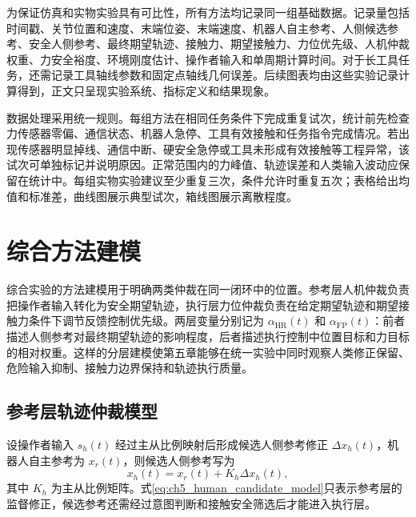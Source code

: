 为保证仿真和实物实验具有可比性，所有方法均记录同一组基础数据。记录量包括时间戳、关节位置和速度、末端位姿、末端速度、机器人自主参考、人侧候选参考、安全人侧参考、最终期望轨迹、接触力、期望接触力、力位优先级、人机仲裁权重、力安全裕度、环境刚度估计、操作者输入和单周期计算时间。对于长工具任务，还需记录工具轴线参数和固定点轴线几何误差。后续图表均由这些实验记录计算得到，正文只呈现实验系统、指标定义和结果现象。

数据处理采用统一规则。每组方法在相同任务条件下完成重复试次，统计前先检查力传感器零偏、通信状态、机器人急停、工具有效接触和任务指令完成情况。若出现传感器明显掉线、通信中断、硬安全急停或工具未形成有效接触等工程异常，该试次可单独标记并说明原因。正常范围内的力峰值、轨迹误差和人类输入波动应保留在统计中。每组实物实验建议至少重复三次，条件允许时重复五次；表格给出均值和标准差，曲线图展示典型试次，箱线图展示离散程度。

\section{综合方法建模}
\label{sec:ch5_integrated_model}

综合实验的方法建模用于明确两类仲裁在同一闭环中的位置。参考层人机仲裁负责把操作者输入转化为安全期望轨迹，执行层力位仲裁负责在给定期望轨迹和期望接触力条件下调节反馈控制优先级。两层变量分别记为 $\alpha_{\mathrm{HR}}(t)$ 和 $\alpha_{\mathrm{FP}}(t)$：前者描述人侧参考对最终期望轨迹的影响程度，后者描述执行控制中位置目标和力目标的相对权重。这样的分层建模使第五章能够在统一实验中同时观察人类修正保留、危险输入抑制、接触力边界保持和轨迹执行质量。

\subsection{参考层轨迹仲裁模型}
\label{subsec:ch5_reference_arbitration_model}

设操作者输入 $s_h(t)$ 经过主从比例映射后形成候选人侧参考修正 $\Delta x_h(t)$，机器人自主参考为 $x_r(t)$，则候选人侧参考写为
\begin{equation}
  x_h(t)=x_r(t)+K_h\Delta x_h(t),
  \label{eq:ch5_human_candidate_model}
\end{equation}
其中 $K_h$ 为主从比例矩阵。式\eqref{eq:ch5_human_candidate_model}只表示参考层的监督修正，候选参考还需经过意图判断和接触安全筛选后才能进入执行层。

